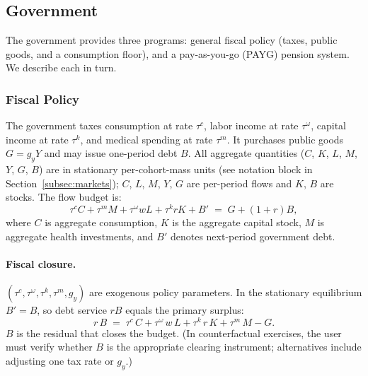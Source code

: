 \documentclass[12pt,a4paper]{article}
\begin{document}
\subsection{Government}
\label{subsec:government}

The government provides three programs: general fiscal policy (taxes, public goods, and a consumption floor), and a pay-as-you-go (PAYG) pension system. We describe each in turn.

\subsubsection{Fiscal Policy}
\label{subsubsec:fiscal}
The government taxes consumption at rate $\tau^c$, labor income at rate $\tau^\omega$, capital income at rate $\tau^k$, and medical spending at rate $\tau^m$. It purchases public goods $G = g_y Y$ and may issue one-period debt $B$. All aggregate quantities ($C$, $K$, $L$, $M$, $Y$, $G$, $B$) are in stationary per-cohort-mass units (see notation block in Section~\ref{subsec:markets}); $C$, $L$, $M$, $Y$, $G$ are per-period flows and $K$, $B$ are stocks. The flow budget is:
\begin{equation}
\label{eq:gov_budget}
\tau^c C + \tau^m M + \tau^\omega w L + \tau^k r K + B' \;=\; G + (1+r)B,
\end{equation}
where $C$ is aggregate consumption, $K$ is the aggregate capital stock, $M$ is aggregate health investments, and $B'$ denotes next-period government debt.

\paragraph{Fiscal closure.}
$(\tau^c, \tau^\omega, \tau^k, \tau^m, g_y)$ are exogenous policy parameters. In the stationary equilibrium $B' = B$, so debt service $r B$ equals the primary surplus:
\begin{equation}
\label{eq:gov_stationary}
r\, B \;=\; \tau^c\, C + \tau^\omega\, w\, L + \tau^k\, r\, K + \tau^m\, M - G.
\end{equation}
$B$ is the residual that closes the budget. (In counterfactual exercises, the user must verify whether $B$ is the appropriate clearing instrument; alternatives include adjusting one tax rate or $g_y$.)
\end{document}
